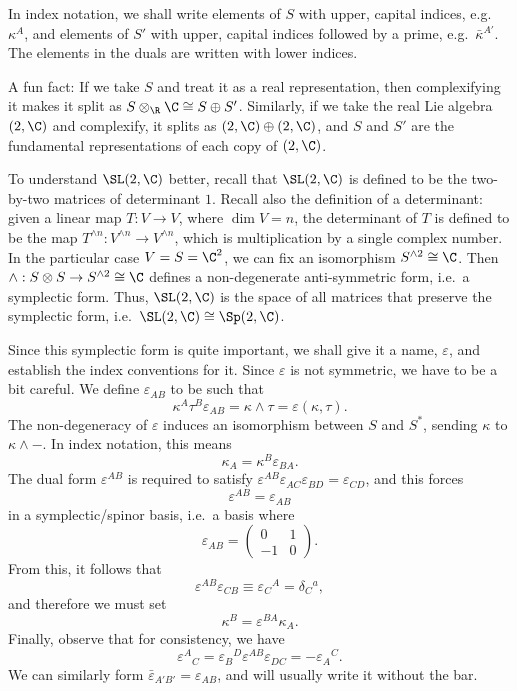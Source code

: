 \documentclass[a4paper]{article}
\begin{document}
In index notation, we shall write elements of $S$ with upper, capital indices, e.g.\ $\kappa^A$, and elements of $S'$ with upper, capital indices followed by a prime, e.g.\ $\bar{\kappa}^{A'}$. The elements in the duals are written with lower indices.

A fun fact: If we take $S$ and treat it as a real representation, then complexifying it makes it split as $S\otimes_\R \C \cong S \oplus S'$. Similarly, if we take the real Lie algebra $\sl(2, \C)$ and complexify, it splits as $\sl(2, \C) \oplus \sl(2, \C)$, and $S$ and $S'$ are the fundamental representations of each copy of $\sl(2, \C)$.

To understand $\SL(2, \C)$ better, recall that $\SL(2, \C)$ is defined to be the two-by-two matrices of determinant $1$. Recall also the definition of a determinant: given a linear map $T: V \to V$, where $\dim V = n$, the determinant of $T$ is defined to be the map $T^{\wedge n}: V^{\wedge n} \to V^{\wedge n}$, which is multiplication by a single complex number. In the particular case $V = S = \C^2$, we can fix an isomorphism $S^{\wedge 2} \cong \C$. Then $\wedge: S \otimes S \to S^{\wedge 2} \cong \C$ defines a non-degenerate anti-symmetric form, i.e.\ a symplectic form. Thus, $\SL(2, \C)$ is the space of all matrices that preserve the symplectic form, i.e.\ $\SL(2, \C) \cong \Sp(2, \C)$.

Since this symplectic form is quite important, we shall give it a name, $\varepsilon$, and establish the index conventions for it. Since $\varepsilon$ is not symmetric, we have to be a bit careful. We define $\varepsilon_{AB}$ to be such that
\[
  \kappa^A \tau^B \varepsilon_{AB} = \kappa \wedge \tau = \varepsilon(\kappa, \tau).
\]
The non-degeneracy of $\varepsilon$ induces an isomorphism between $S$ and $S^*$, sending $\kappa$ to $\kappa \wedge -$. In index notation, this means
\[
  \kappa_A = \kappa^B \varepsilon_{BA}.
\]
The dual form $\varepsilon^{AB}$ is required to satisfy $\varepsilon^{AB} \varepsilon_{AC} \varepsilon_{BD} = \varepsilon_{CD}$, and this forces
\[
  \varepsilon^{AB} = \varepsilon_{AB}
\]
in a symplectic/spinor basis, i.e.\ a basis where
\[
  \varepsilon_{AB} =
  \begin{pmatrix}
    0 & 1\\
    -1 & 0
  \end{pmatrix}.
\]
From this, it follows that
\[
  \varepsilon^{AB} \varepsilon_{CB} \equiv \varepsilon_C\!^A = \delta_C\!^a,
\]
and therefore we must set
\[
  \kappa^B = \varepsilon^{BA} \kappa_A.
\]
Finally, observe that for consistency, we have
\[
  \varepsilon^A\!_C = \varepsilon_B\!^D \varepsilon^{AB} \varepsilon_{DC} = - \varepsilon_A\!^C.
\]
We can similarly form $\bar{\varepsilon}_{A'B'} = \varepsilon_{AB}$, and will usually write it without the bar.
\end{document}
